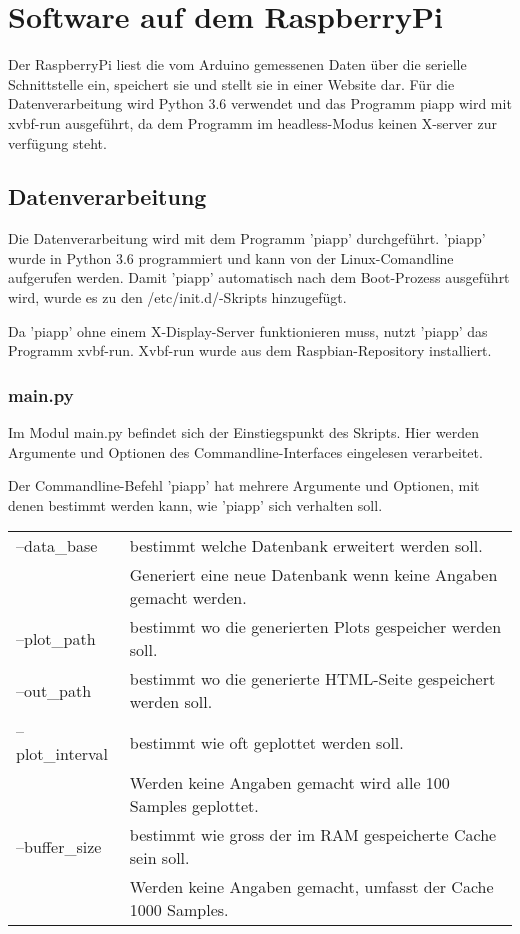 \documentclass{article}
\begin{document}
\section{Software auf dem RaspberryPi}
Der RaspberryPi liest die vom Arduino gemessenen Daten über die serielle Schnittstelle ein, speichert sie und stellt sie in einer Website dar.
Für die Datenverarbeitung wird Python 3.6 verwendet und das Programm piapp wird mit xvbf-run ausgeführt, da dem Programm im headless-Modus keinen X-server zur verfügung steht.
\subsection{Datenverarbeitung}
Die Datenverarbeitung wird mit dem Programm 'piapp' durchgeführt.
'piapp' wurde in Python 3.6 programmiert und kann von der Linux-Comandline aufgerufen werden.
Damit 'piapp' automatisch nach dem Boot-Prozess ausgeführt wird, wurde es zu den /etc/init.d/-Skripts hinzugefügt.

Da 'piapp' ohne einem X-Display-Server funktionieren muss, nutzt 'piapp' das Programm xvbf-run.
Xvbf-run wurde aus dem Raspbian-Repository installiert.

\subsubsection{main.py}
Im Modul main.py befindet sich der Einstiegspunkt des Skripts.
Hier werden Argumente und Optionen des Commandline-Interfaces eingelesen verarbeitet.

Der Commandline-Befehl 'piapp' hat mehrere Argumente und Optionen, mit denen bestimmt werden kann, wie 'piapp' sich verhalten soll.

\begin{tabular}{l l}
--data\_base     & bestimmt welche Datenbank erweitert werden soll. \\
~                & Generiert eine neue Datenbank wenn keine Angaben gemacht werden. \\
--plot\_path     & bestimmt wo die generierten Plots gespeicher werden soll. \\
--out\_path      & bestimmt wo die generierte HTML-Seite gespeichert werden soll. \\
--plot\_interval & bestimmt wie oft geplottet werden soll. \\
~                & Werden keine Angaben gemacht wird alle 100 Samples geplottet. \\
--buffer\_size   & bestimmt wie gross der im RAM gespeicherte Cache sein soll. \\
~                & Werden keine Angaben gemacht, umfasst der Cache 1000 Samples. 
\end{tabular}
\end{document}
